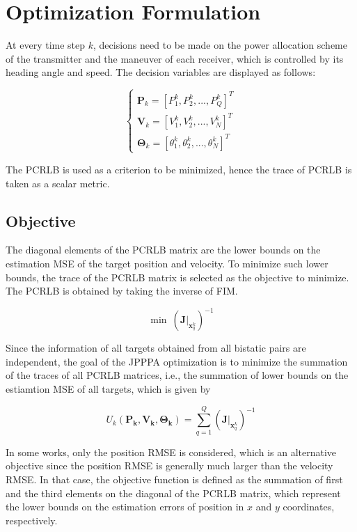 \documentclass[12pt,journal,draftclsnofoot,onecolumn]{IEEEtran}
\begin{document}
\section{Optimization Formulation}
At every time step $k$, decisions need to be made on the power allocation scheme of the transmitter and the maneuver of each receiver, which is controlled by its heading angle and speed. The decision variables are displayed as follows:

\begin{equation}
    \left\{
    \begin{array}{lr}
    \mathbf{P}_k=[P_1^k, P_2^k,..., P_Q^k]^T
    \\\mathbf{V}_k=[V_1^k, V_2^k,..., V_N^k]^T
    \\\mathbf{\Theta}_k=[\theta_1^k, \theta_2^k,..., \theta_N^k]^T
    \end{array}
    \right.
\end{equation}

The PCRLB is used as a criterion to be minimized, hence the trace of PCRLB is taken as a scalar metric.

\subsection{Objective}
The diagonal elements of the PCRLB matrix are the lower bounds on the estimation MSE of the target position and velocity. To minimize such lower bounds, the trace of the PCRLB matrix is selected as the objective to minimize. The PCRLB is obtained by taking the inverse of FIM. 

\begin{equation}
    \min\ (\mathbf{J}|_{\mathbf{x}_q^k})^{-1}
\end{equation}

Since the information of all targets obtained from all bistatic pairs are independent, the goal of the JPPPA optimization is to minimize the summation of the traces of all PCRLB matrices, i.e., the summation of lower bounds on the estiamtion MSE of all targets, which is given by

\begin{equation}
    U_k(\mathbf{P_k},\mathbf{V_k},\mathbf{\Theta_k})=\sum_{q=1}^Q(\mathbf{J}|_{\mathbf{x}_q^k})^{-1}
\end{equation}

In some works\cite{xie2017joint}, only the position RMSE %
 is considered, which is an alternative objective since the position RMSE is generally much larger than the velocity RMSE. In that case, the objective function is defined as the summation of first and the third elements on the diagonal of the PCRLB matrix, which represent the lower bounds on the estimation errors of position in $x$ and $y$ coordinates, respectively.
\end{document}
